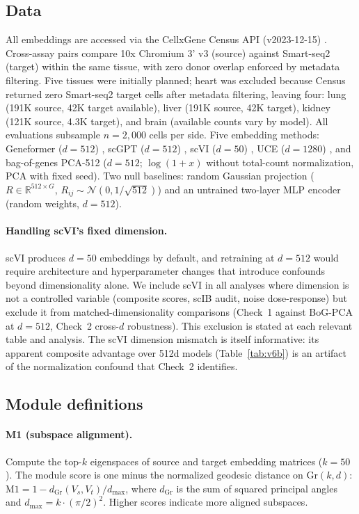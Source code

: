 \documentclass[10pt,letterpaper]{article}
\newcommand{\Gr}{\mathrm{Gr}}
\begin{document}
\subsection{Data}

All embeddings are accessed via the CellxGene Census API (v2023-12-15) \citep{abdulla2025cellxgene}. Cross-assay pairs compare 10x Chromium 3' v3 (source) against Smart-seq2 (target) within the same tissue, with zero donor overlap enforced by metadata filtering. Five tissues were initially planned; heart was excluded because Census returned zero Smart-seq2 target cells after metadata filtering, leaving four: lung (191K source, 42K target available), liver (191K source, 42K target), kidney (121K source, 4.3K target), and brain (available counts vary by model). All evaluations subsample $n = 2{,}000$ cells per side. Five embedding methods: Geneformer ($d = 512$) \citep{theodoris2023geneformer}, scGPT ($d = 512$) \citep{cui2024scgpt}, scVI ($d = 50$) \citep{lopez2018scvi}, UCE ($d = 1280$) \citep{rosen2026uce}, and bag-of-genes PCA-512 ($d = 512$; $\log(1 + x)$ without total-count normalization, PCA with fixed seed). Two null baselines: random Gaussian projection ($R \in \mathbb{R}^{512 \times G}$, $R_{ij} \sim \mathcal{N}(0, 1/\sqrt{512})$) and an untrained two-layer MLP encoder (random weights, $d = 512$).

\paragraph{Handling scVI's fixed dimension.} scVI produces $d = 50$ embeddings by default, and retraining at $d = 512$ would require architecture and hyperparameter changes that introduce confounds beyond dimensionality alone. We include scVI in all analyses where dimension is not a controlled variable (composite scores, scIB audit, noise dose-response) but exclude it from matched-dimensionality comparisons (Check~1 against BoG-PCA at $d = 512$, Check~2 cross-$d$ robustness). This exclusion is stated at each relevant table and analysis. The scVI dimension mismatch is itself informative: its apparent composite advantage over 512d models (Table~\ref{tab:v6b}) is an artifact of the normalization confound that Check~2 identifies.

\subsection{Module definitions}

\paragraph{M1 (subspace alignment).} Compute the top-$k$ eigenspaces of source and target embedding matrices ($k = 50$). The module score is one minus the normalized geodesic distance on $\Gr(k, d)$: $\text{M1} = 1 - d_{\Gr}(V_s, V_t) / d_{\max}$, where $d_{\Gr}$ is the sum of squared principal angles and $d_{\max} = k \cdot (\pi/2)^2$. Higher scores indicate more aligned subspaces.
\end{document}
